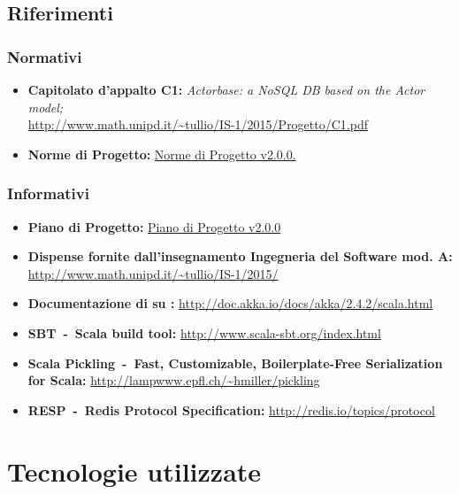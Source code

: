 \documentclass{scalatekids-article}
\begin{document}
\prodPurpose

\glossExpl

\subsection{Riferimenti}

\subsubsection{Normativi}

\begin{itemize}

\item\textbf{Capitolato d'appalto C1:} \textit{Actorbase: a NoSQL DB based on the Actor model;}\\
  \url{http://www.math.unipd.it/~tullio/IS-1/2015/Progetto/C1.pdf}
\item\textbf{Norme di Progetto:}
  \href{run:../Interni/NormeDiProgetto\_v2.0.0.pdf}{Norme di Progetto v2.0.0.}
\end{itemize}

\subsubsection{Informativi}

\begin{itemize}
\item\textbf{Piano di Progetto:}
  \href{run:./PianoDiProgetto\_v2.0.0.pdf}{Piano di Progetto v2.0.0}
\item\textbf{Dispense fornite dall'insegnamento Ingegneria del Software mod.
    A:}\\   \url{http://www.math.unipd.it/~tullio/IS-1/2015/}
\item\textbf{Documentazione di  su :}
  \url{http://doc.akka.io/docs/akka/2.4.2/scala.html}
\item\textbf{SBT\ -\ Scala build tool:}
  \url{http://www.scala-sbt.org/index.html}
\item\textbf{Scala Pickling\ -\ Fast, Customizable, Boilerplate-Free Serialization for Scala:}
  \url{http://lampwww.epfl.ch/~hmiller/pickling}
\item\textbf{RESP\ -\ Redis Protocol Specification:}
  \url{http://redis.io/topics/protocol}
\end{itemize}

\newpage

\section{Tecnologie utilizzate}
\end{document}
